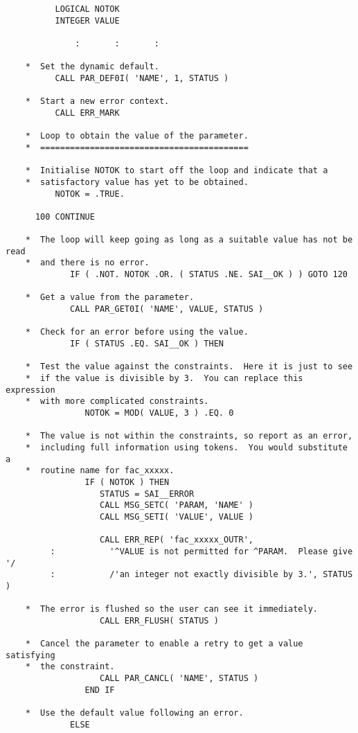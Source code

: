 \documentclass[twoside,11pt]{article}
\begin{document}
\begin{verbatim}
          LOGICAL NOTOK
          INTEGER VALUE

              :       :       :

    *  Set the dynamic default.
          CALL PAR_DEF0I( 'NAME', 1, STATUS )

    *  Start a new error context.
          CALL ERR_MARK

    *  Loop to obtain the value of the parameter.
    *  ==========================================

    *  Initialise NOTOK to start off the loop and indicate that a 
    *  satisfactory value has yet to be obtained.
          NOTOK = .TRUE.

      100 CONTINUE

    *  The loop will keep going as long as a suitable value has not be read
    *  and there is no error.
             IF ( .NOT. NOTOK .OR. ( STATUS .NE. SAI__OK ) ) GOTO 120

    *  Get a value from the parameter.
             CALL PAR_GET0I( 'NAME', VALUE, STATUS )

    *  Check for an error before using the value.
             IF ( STATUS .EQ. SAI__OK ) THEN

    *  Test the value against the constraints.  Here it is just to see
    *  if the value is divisible by 3.  You can replace this expression
    *  with more complicated constraints.
                NOTOK = MOD( VALUE, 3 ) .EQ. 0

    *  The value is not within the constraints, so report as an error,
    *  including full information using tokens.  You would substitute a 
    *  routine name for fac_xxxxx.
                IF ( NOTOK ) THEN
                   STATUS = SAI__ERROR
                   CALL MSG_SETC( 'PARAM, 'NAME' )
                   CALL MSG_SETI( 'VALUE', VALUE )

                   CALL ERR_REP( 'fac_xxxxx_OUTR',
         :           '^VALUE is not permitted for ^PARAM.  Please give '/
         :           /'an integer not exactly divisible by 3.', STATUS )

    *  The error is flushed so the user can see it immediately.
                   CALL ERR_FLUSH( STATUS )

    *  Cancel the parameter to enable a retry to get a value satisfying
    *  the constraint.
                   CALL PAR_CANCL( 'NAME', STATUS )
                END IF

    *  Use the default value following an error.
             ELSE


\end{verbatim}
\end{document}
